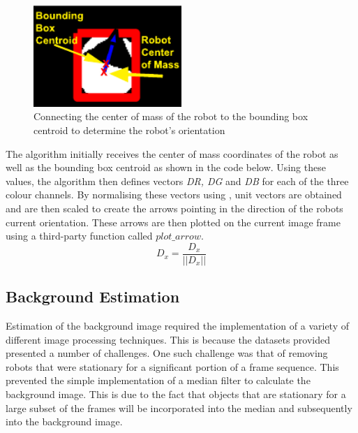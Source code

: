 \documentclass{article}
\begin{document}
\begin{figure}[h!]
	\centering
		\includegraphics[width=0.5\textwidth]{../Drawings/orientationAlgorithm.pdf}
	\caption{Connecting the center of mass of the robot to the bounding box centroid to determine the robot's orientation}
	\label{fig:orientation}
\end{figure}

The algorithm initially receives the center of mass coordinates of the robot as well as the bounding box centroid as shown in the code below. Using these values, the algorithm then defines vectors \textit{DR, DG} and \textit{DB} for each of the three colour channels. By normalising these vectors using , unit vectors are obtained and are then scaled to create the arrows pointing in the direction of the robots current orientation. These arrows are then plotted on the current image frame using a third-party function called \textit{$plot\_arrow$}.\\

\begin{equation}
D_{x} = \frac{D_{x}}{\vert\vert D_{x} \vert\vert}
\label{eqn:norm}
\end{equation}



\subsection{Background Estimation}
\label{sec:back}
Estimation of the background image required the implementation of a variety of different image processing techniques. This is because the datasets provided presented a number of challenges. One such challenge was that of removing robots that were stationary for a significant portion of a frame sequence. This prevented the simple implementation of a median filter to calculate the background image. This is due to the fact that objects that are stationary for a large subset of the frames will be incorporated into the median and subsequently into the background image.\\
\end{document}
